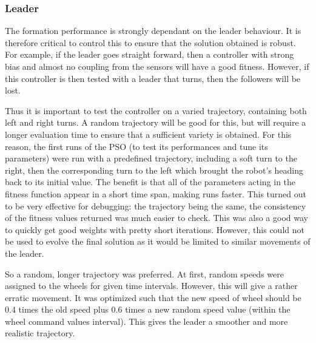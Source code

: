 \documentclass[a4paper, 10pt, conference]{ieeeconf}      %
\begin{document}
\subsubsection{Leader}
The formation performance is strongly dependant on the leader behaviour. It is therefore critical to control this to ensure that the solution obtained is robust. For example, if the leader goes straight forward, then a controller with strong bias and almost no coupling from the sensors will have a good fitness. However, if this controller is then tested with a leader that turns, then the followers will be lost. 

Thus it is important to test the controller on a varied trajectory, containing both left and right turns. A random trajectory will be good for this, but will require a longer evaluation time to ensure that a sufficient variety is obtained. For this reason, the first runs of the PSO (to test its performances and tune its parameters) were run with a predefined trajectory, including a soft turn to the right, then the corresponding turn to the left which brought the robot's heading back to its initial value. The benefit is that all of the parameters acting in the fitness function appear in a short time span, making runs faster. This turned out to be very effective for debugging: the trajectory being the same, the consistency of the fitness values returned was much easier to check. This was also a good way to quickly get good weights with pretty short iterations. However, this could not be used to evolve the final solution as it would be limited to similar movements of the leader.

So a random, longer trajectory was preferred. At first, random speeds were assigned to the wheels for given time intervals. However, this will give a rather erratic movement. It was optimized such that the new speed of wheel should be 0.4 times the old speed plus 0.6 times a new random speed value (within the wheel command values interval). This gives the leader a smoother and more realistic trajectory.

\addtolength{\textheight}{-3cm}   %
\end{document}

